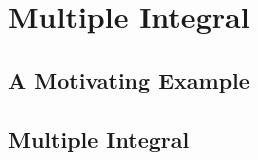 \chapter{Multiple Integral} \label{ch7ch}

\section{A Motivating Example}

\section{Multiple Integral}

